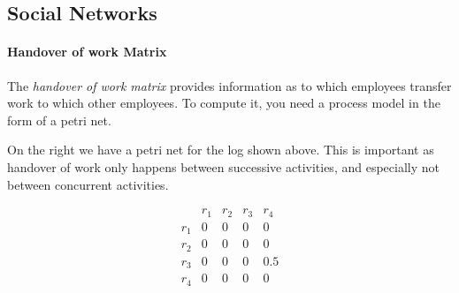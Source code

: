 \documentclass[english]{panikzettel}
\begin{document}
\subsection{Social Networks}

\begin{halfboxl}
\paragraph{Handover of work Matrix} The \textit{handover of work matrix} provides information as to which employees transfer work to which other employees. To compute it, you need a process model in the form of a petri net.

On the right we have a petri net for the log shown above. This is important as handover of work only happens between successive activities, and especially not between concurrent activities.
\end{halfboxl}%
\begin{halfboxr}
\vspace{-\baselineskip}
    \begin{center}
    \end{center}
    \[\begin{array}{c|c|c|c|c}
        & r_1   & r_2   & r_3   & r_4   \\ \hline
    r_1 & 0     & 0     & 0     & 0     \\ \hline
    r_2 & 0     & 0     & 0     & 0     \\ \hline
    r_3 & 0     & 0     & 0     & 0.5   \\ \hline
    r_4 & 0     & 0     & 0     & 0     \\
\end{array}\]
\end{halfboxr}
\end{document}
